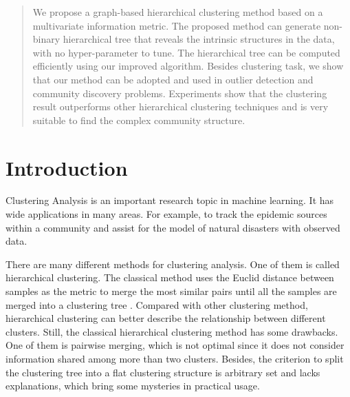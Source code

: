 
\date{Received: date / Accepted: date}


\maketitle

\begin{abstract}
We propose a graph-based hierarchical clustering method based on a multivariate information metric.
The proposed method can generate non-binary hierarchical tree that reveals the intrinsic structures in the data, with no hyper-parameter to tune. 
The hierarchical tree can be computed efficiently using
our improved algorithm. Besides clustering task, we show that our method can be adopted and
used in outlier detection and community discovery problems.
Experiments show that the clustering result outperforms
other hierarchical clustering techniques and is very suitable to find the complex community structure.
\end{abstract}

\section{Introduction}
\label{intro}
Clustering Analysis is an important research topic in machine learning.
It has wide applications in many areas. For example, to track the epidemic
sources within a community and assist for the model of natural disasters with observed data.

There are many different methods for clustering analysis. One of them is called
hierarchical clustering. The classical method uses the Euclid distance between samples
as the metric to merge the most similar pairs until all the samples are merged into a clustering
tree \citep{slink}. Compared with other clustering method, hierarchical clustering can better describe the relationship between different clusters. Still, the classical hierarchical clustering method has some
drawbacks. One of them is pairwise merging, which is not optimal since it does not consider information shared among more than two clusters. Besides, the criterion to split the clustering tree into a flat clustering structure is arbitrary set and lacks explanations, which bring some mysteries in practical
usage.

